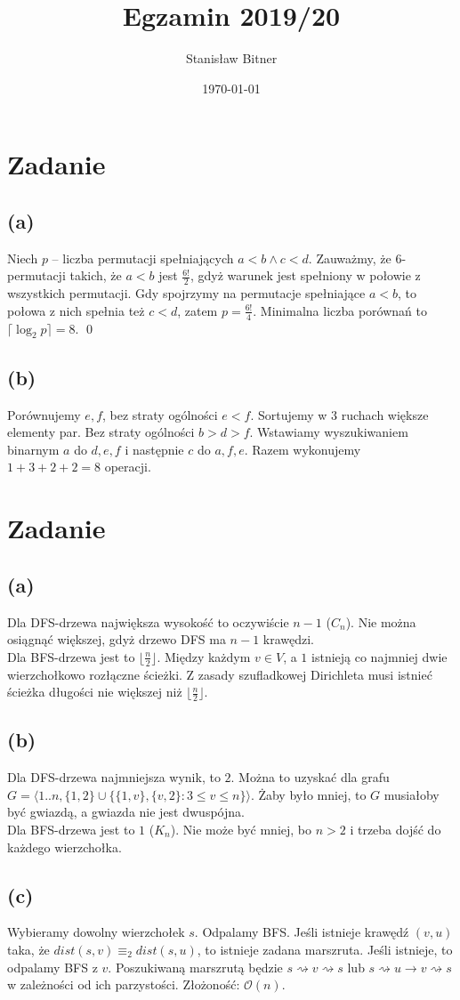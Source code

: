 \documentclass[12pt, a4paper]{article}
\title{Egzamin 2019/20}
\author{Stanisław Bitner}
\date{\today}
\newcommand{\MCALO}{\mathcal{O}}
\newcounter{zadanie}
\newcommand{\zadanie}{\addtocounter{zadanie}{1}\section*{Zadanie \arabic{zadanie}}}
\begin{document}
\maketitle
\zadanie{}
\subsection*{(a)}
Niech $p$ -- liczba permutacji spełniających $a<b \land c<d$. Zauważmy, że
6-permutacji takich, że $a<b$ jest $\frac{6!}{2}$, gdyż warunek jest spełniony
w połowie z wszystkich permutacji. Gdy spojrzymy na permutacje spełniające
$a<b$, to połowa z nich spełnia też $c<d$, zatem $p = \frac{6!}{4}$. Minimalna
liczba porównań to $\lceil\log_2{p}\rceil = 8$. \qed

\subsection*{(b)}
Porównujemy $e,f$, bez straty ogólności $e<f$. Sortujemy w $3$ ruchach większe
elementy par. Bez straty ogólności $b>d>f$. Wstawiamy wyszukiwaniem binarnym
$a$ do $d,e,f$ i następnie $c$ do $a,f,e$. Razem wykonujemy $1+3+2+2 = 8$
operacji.

\zadanie{}
\subsection*{(a)}
Dla DFS-drzewa największa wysokość to oczywiście $n-1$ ($C_n$). Nie można
osiągnąć większej, gdyż drzewo DFS ma $n-1$ krawędzi.\\
Dla BFS-drzewa jest to $\lfloor\frac{n}{2}\rfloor$. Między każdym $v \in V$,
a $1$ istnieją co najmniej dwie wierzchołkowo rozłączne ścieżki. Z zasady
szufladkowej Dirichleta musi istnieć ścieżka długości nie większej niż
$\lfloor\frac{n}{2}\rfloor$.

\subsection*{(b)}
Dla DFS-drzewa najmniejsza wynik, to $2$. Można to uzyskać dla grafu\\
$G = \langle1..n, \{1,2\}\cup\{\{1,v\},\{v,2\} : 3\le v\le n\}\rangle$. Żaby
było mniej, to $G$ musiałoby być gwiazdą, a gwiazda nie jest dwuspójna.\\
Dla BFS-drzewa jest to $1$ ($K_n$). Nie może być mniej, bo $n>2$ i trzeba dojść
do każdego wierzchołka.

\subsection*{(c)}
Wybieramy dowolny wierzchołek $s$. Odpalamy BFS. Jeśli istnieje krawędź $(v,u)$
taka, że $dist(s,v) \equiv_2 dist(s,u)$, to istnieje zadana marszruta. Jeśli
istnieje, to odpalamy BFS z $v$. Poszukiwaną marszrutą będzie $s
\rightsquigarrow v \rightsquigarrow s$ lub $s \rightsquigarrow u \rightarrow
v \rightsquigarrow s$ w zależności od ich parzystości.
Złożoność: $\MCALO(n)$.
\end{document}
